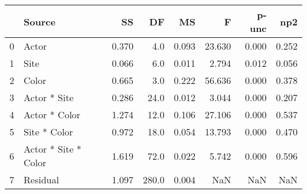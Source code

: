 \begin{tabular}{llrrrrrr}
\toprule
{} &                Source &     SS &     DF &     MS &       F &  p-unc &    np2 \\
\midrule
0 &                 Actor &  0.370 &    4.0 &  0.093 &  23.630 &  0.000 &  0.252 \\
1 &                  Site &  0.066 &    6.0 &  0.011 &   2.794 &  0.012 &  0.056 \\
2 &                 Color &  0.665 &    3.0 &  0.222 &  56.636 &  0.000 &  0.378 \\
3 &          Actor * Site &  0.286 &   24.0 &  0.012 &   3.044 &  0.000 &  0.207 \\
4 &         Actor * Color &  1.274 &   12.0 &  0.106 &  27.106 &  0.000 &  0.537 \\
5 &          Site * Color &  0.972 &   18.0 &  0.054 &  13.793 &  0.000 &  0.470 \\
6 &  Actor * Site * Color &  1.619 &   72.0 &  0.022 &   5.742 &  0.000 &  0.596 \\
7 &              Residual &  1.097 &  280.0 &  0.004 &     NaN &    NaN &    NaN \\
\bottomrule
\end{tabular}
